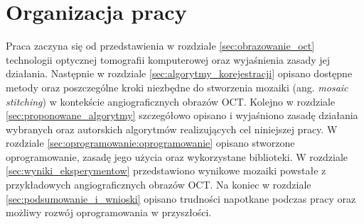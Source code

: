 \section{Organizacja pracy}
\label{sec:wstep:organizacja_pracy}

Praca zaczyna się od przedstawienia w rozdziale \ref{sec:obrazowanie_oct} technologii optycznej tomografii komputerowej oraz wyjaśnienia zasady jej działania. Następnie w rozdziale \ref{sec:algorytmy_korejestracji} opisano dostępne metody oraz poszczególne kroki niezbędne do stworzenia mozaiki (ang. \textit{mosaic stitching}) w kontekście angiograficznych obrazów OCT. Kolejno w rozdziale \ref{sec:proponowane_algorytmy} szczegółowo opisano i wyjaśniono zasadę działania wybranych oraz autorskich algorytmów realizujących cel niniejszej pracy. W rozdziale \ref{sec:oprogramowanie:oprogramowanie} opisano stworzone oprogramowanie, zasadę jego użycia oraz wykorzystane biblioteki. W rozdziale \ref{sec:wyniki_eksperymentow} przedstawiono wynikowe mozaiki powstałe z przykładowych angiograficznych obrazów OCT. Na koniec w rozdziale \ref{sec:podsumowanie_i_wnioski} opisano trudności napotkane podczas pracy oraz możliwy rozwój oprogramowania w przyszłości.


